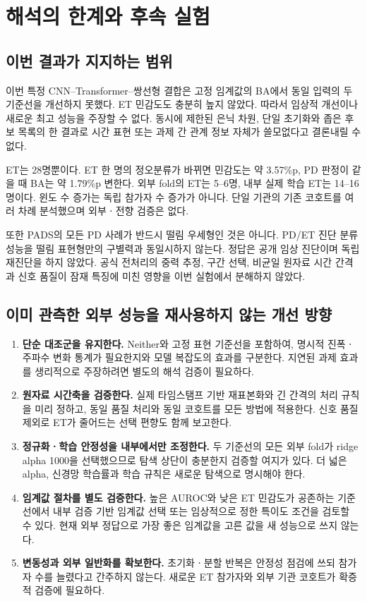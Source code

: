 \documentclass[11pt,a4paper]{article}
\numberwithin{equation}{section}
\begin{document}
\section{해석의 한계와 후속 실험}
\subsection{이번 결과가 지지하는 범위}
이번 특정 CNN--Transformer--쌍선형 결합은 고정 임계값의 BA에서
동일 입력의 두 기준선을 개선하지 못했다. ET 민감도도 충분히 높지 않았다.
따라서 임상적 개선이나 새로운 최고 성능을 주장할 수 없다.
동시에 제한된 은닉 차원, 단일 초기화와 좁은 후보 목록의 한 결과로
시간 표현 또는 과제 간 관계 정보 자체가 쓸모없다고 결론내릴 수 없다.

ET는 28명뿐이다. ET 한 명의 정오분류가 바뀌면 민감도는 약 3.57\%p,
PD 판정이 같을 때 BA는 약 1.79\%p 변한다. 외부 fold의 ET는 5--6명,
내부 실제 학습 ET는 14--16명이다. 윈도 수 증가는 독립 참가자 수 증가가 아니다.
단일 기관의 기존 코호트를 여러 차례 분석했으며 외부ㆍ전향 검증은 없다.

또한 PADS의 모든 PD 사례가 반드시 떨림 우세형인 것은 아니다.
PD/ET 진단 분류 성능을 떨림 표현형만의 구별력과 동일시하지 않는다.
정답은 공개 임상 진단이며 독립 재진단을 하지 않았다.
공식 전처리의 중력 추정, 구간 선택, 비균일 원자료 시간 간격과 신호 품질이
잠재 특징에 미친 영향을 이번 실험에서 분해하지 않았다.

\subsection{이미 관측한 외부 성능을 재사용하지 않는 개선 방향}
\begin{enumerate}
 \item \textbf{단순 대조군을 유지한다.} Neither와 고정 표현 기준선을 포함하여,
 명시적 진폭ㆍ주파수 변화 통계가 필요한지와 모델 복잡도의 효과를 구분한다.
 지연된 과제 효과를 생리적으로 주장하려면 별도의 해석 검증이 필요하다.
 \item \textbf{원자료 시간축을 검증한다.} 실제 타임스탬프 기반 재표본화와 긴 간격의
 처리 규칙을 미리 정하고, 동일 품질 처리와 동일 코호트를 모든 방법에 적용한다.
 신호 품질 제외로 ET가 줄어드는 선택 편향도 함께 보고한다.
 \item \textbf{정규화ㆍ학습 안정성을 내부에서만 조정한다.} 두 기준선의 모든 외부
 fold가 ridge alpha 1000을 선택했으므로 탐색 상단이 충분한지 검증할 여지가 있다.
 더 넓은 alpha, 신경망 학습률과 학습 규칙은 새로운 탐색으로 명시해야 한다.
 \item \textbf{임계값 절차를 별도 검증한다.} 높은 AUROC와 낮은 ET 민감도가 공존하는
 기준선에서 내부 검증 기반 임계값 선택 또는 임상적으로 정한 특이도 조건을
 검토할 수 있다. 현재 외부 정답으로 가장 좋은 임계값을 고른 값을 새 성능으로 쓰지 않는다.
 \item \textbf{변동성과 외부 일반화를 확보한다.} 초기화ㆍ분할 반복은 안정성 점검에
 쓰되 참가자 수를 늘렸다고 간주하지 않는다. 새로운 ET 참가자와 외부 기관 코호트가
 확증적 검증에 필요하다.
\end{enumerate}
\end{document}
